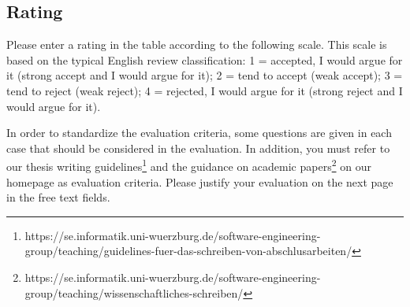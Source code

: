 \documentclass[12pt]{scrartcl}
\begin{document}
\subsection*{Rating}
Please enter a rating in the table according to the following scale. This scale is based on the typical English review classification: 1 = accepted, I would argue for it (strong accept and I would argue for it); 2 = tend to accept (weak accept); 3 = tend to reject (weak reject); 4 = rejected, I would argue for it (strong reject and I would argue for it).

In order to standardize the evaluation criteria, some questions are given in each case that should be considered in the evaluation. In addition, you must refer to our thesis writing guidelines\footnote{https://se.informatik.uni-wuerzburg.de/software-engineering-group/teaching/guidelines-fuer-das-schreiben-von-abschlusarbeiten/} and the guidance on academic papers\footnote{https://se.informatik.uni-wuerzburg.de/software-engineering-group/teaching/wissenschaftliches-schreiben/} on our homepage as evaluation criteria. Please justify your evaluation on the next page in the free text fields.
\end{document}
